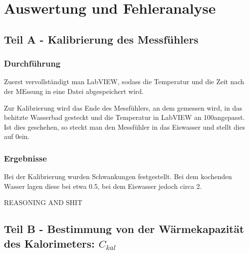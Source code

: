 \documentclass[11pt,a4paper]{article}
\begin{document}
\section{Auswertung und Fehleranalyse}

\subsection{Teil A - Kalibrierung des Messf\"uhlers}

\subsubsection{Durchf\"uhrung}

Zuerst vervollst\"andigt man LabVIEW, sodass die Temperatur und die Zeit nach der MEssung in eine Datei abgespeichert wird.

Zur Kalibrierung wird das Ende des Messf\"uhlers, an dem gemessen wird, in das behitzte Wasserbad gesteckt und die Temperatur in LabVIEW an 100\celsius angepasst. Ist dies geschehen, so steckt man den Messf\"uhler in das Eiswasser und stellt dies auf 0\celsius ein.

\subsubsection{Ergebnisse}

Bei der Kalibrierung wurden Schwankungen festgestellt. Bei dem kochenden Wasser lagen diese bei etwa 0.5\celsius, bei dem Eiswasser jedoch circa 2\celsius.

REASONING AND SHIT

%

\subsection{Teil B - Bestimmung von der Wärmekapazität des Kalorimeters: $C_{kal}$}
\end{document}

